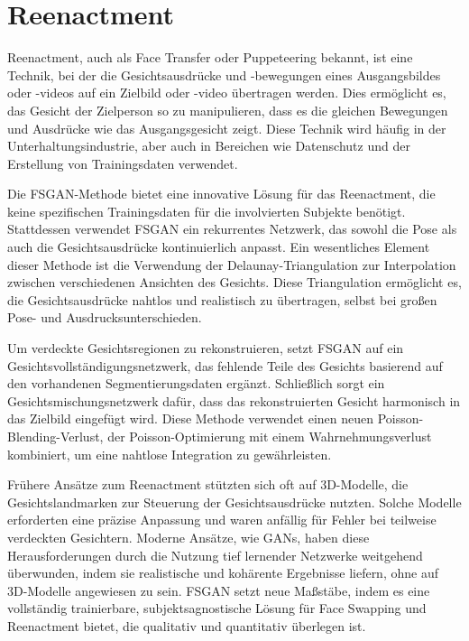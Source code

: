 \section{Reenactment}\label{sec:reenactment}
Reenactment, auch als Face Transfer oder Puppeteering bekannt, ist eine Technik, bei der die Gesichtsausdrücke und -bewegungen eines Ausgangsbildes oder -videos auf ein Zielbild oder -video übertragen werden. Dies ermöglicht es, das Gesicht der Zielperson so zu manipulieren, dass es die gleichen Bewegungen und Ausdrücke wie das Ausgangsgesicht zeigt. Diese Technik wird häufig in der Unterhaltungsindustrie, aber auch in Bereichen wie Datenschutz und der Erstellung von Trainingsdaten verwendet.

Die FSGAN-Methode bietet eine innovative Lösung für das Reenactment, die keine spezifischen Trainingsdaten für die involvierten Subjekte benötigt. Stattdessen verwendet FSGAN ein rekurrentes Netzwerk, das sowohl die Pose als auch die Gesichtsausdrücke kontinuierlich anpasst. Ein wesentliches Element dieser Methode ist die Verwendung der Delaunay-Triangulation zur Interpolation zwischen verschiedenen Ansichten des Gesichts. Diese Triangulation ermöglicht es, die Gesichtsausdrücke nahtlos und realistisch zu übertragen, selbst bei großen Pose- und Ausdrucksunterschieden.

Um verdeckte Gesichtsregionen zu rekonstruieren, setzt FSGAN auf ein Gesichtsvollständigungsnetzwerk, das fehlende Teile des Gesichts basierend auf den vorhandenen Segmentierungsdaten ergänzt. Schließlich sorgt ein Gesichtsmischungsnetzwerk dafür, dass das rekonstruierten Gesicht harmonisch in das Zielbild eingefügt wird. Diese Methode verwendet einen neuen Poisson-Blending-Verlust, der Poisson-Optimierung mit einem Wahrnehmungsverlust kombiniert, um eine nahtlose Integration zu gewährleisten.

Frühere Ansätze zum Reenactment stützten sich oft auf 3D-Modelle, die Gesichtslandmarken zur Steuerung der
Gesichtsausdrücke nutzten. Solche Modelle erforderten eine präzise Anpassung und waren anfällig für Fehler bei
teilweise verdeckten Gesichtern. Moderne Ansätze, wie GANs, haben diese Herausforderungen durch die Nutzung tief
lernender Netzwerke weitgehend überwunden, indem sie realistische und kohärente Ergebnisse liefern, ohne auf 3D-Modelle angewiesen zu sein. FSGAN setzt neue Maßstäbe, indem es eine vollständig trainierbare, subjektsagnostische Lösung für Face Swapping und Reenactment bietet, die qualitativ und quantitativ überlegen ist\cite{face-swapping-and-reenactment}.